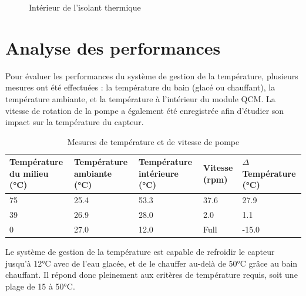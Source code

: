 \begin{figure}[H]
\begin{minipage}{0.48\textwidth}
        \caption{Intérieur de l'isolant thermique}
        \label{fig:Interieur_Isolant}
    \end{minipage}
\end{figure}

\section{Analyse des performances}

Pour évaluer les performances du système de gestion de la température, plusieurs mesures ont été effectuées :  
la température du bain (glacé ou chauffant), la température ambiante, et la température à l’intérieur du module QCM.  
La vitesse de rotation de la pompe a également été enregistrée afin d’étudier son impact sur la température du capteur.

\begin{table}[h!]
\centering
\begin{tabularx}{\textwidth}{|X|X|X|X|X|}
\hline
\textbf{Température du milieu (°C)} & \textbf{Température ambiante (°C)} & \textbf{Température intérieure (°C)} & \textbf{Vitesse (rpm)} & \textbf{$\Delta$ Température (°C)} \\
\hline
75 & 25.4 & 53.3 & 37.6 & 27.9 \\
39 & 26.9 & 28.0 & 2.0 & 1.1  \\
0  & 27.0 & 12.0 & Full & -15.0 \\
\hline
\end{tabularx}
\caption{Mesures de température et de vitesse de pompe}
\end{table}

Le système de gestion de la température est capable de refroidir le capteur jusqu’à 12°C avec de l’eau glacée, et de le chauffer au-delà de 50°C grâce au bain chauffant.  
Il répond donc pleinement aux critères de température requis, soit une plage de 15 à 50°C.